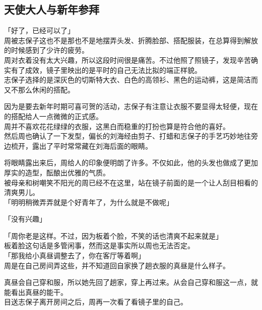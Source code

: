 \subsection{天使大人与新年参拜}

「好了，已经可以了」\\

周被志保子这也不是那也不是地摆弄头发、折腾脸部、搭配服装，在总算得到解放的时候感到了少许的疲劳。\\

周对衣着没有太大兴趣，所以这段时间很是痛苦。不过他照了照镜子，发现辛苦确实有了成效，镜子里映出的是平时的自己无法比拟的端正样貌。\\

志保子选择的是深灰色的切斯特大衣、白色的高领衫、黑色的运动裤，这是简洁而又不那么休闲的搭配。

因为是要去新年时期可喜可贺的活动，志保子有注意让衣服不要显得太轻便，现在的搭配给人一点微微的正式感。\\

周并不喜欢花花绿绿的衣服，这黑白而稳重的打扮也算是符合他的喜好。\\

然后周也确认了一下发型，偏长的刘海经由剪子、打蜡和志保子的手艺巧妙地往旁边梳开，露出了平时常常藏在刘海后面的眼睛。

将眼睛露出来后，周给人的印象便明朗了许多。不仅如此，他的头发也做成了更加厚实的造型，酝酿出优雅的气质。\\

被母亲和树嘲笑不阳光的周已经不在这里，站在镜子前面的是一个让人刮目相看的清爽男儿。\\

「明明稍微弄弄就是个好青年了，为什么就是不做呢」

「没有兴趣」

「周你老是这样。不过，因为板着个脸，不笑的话也清爽不起来就是」\\

板着脸这句话是多管闲事，然而这是事实所以周也无法否定。\\

「那我给小真昼调整去了，你在客厅等着啊」\\

周是在自己房间弄这些，并不知道回自家换了趟衣服的真昼是什么样子。

真昼会自己穿和服，所以她先回了趟家，穿上再过来。从会自己穿和服这一点，就能看出真昼的能干。\\

目送志保子离开房间之后，周再一次看了看镜子里的自己。\\

